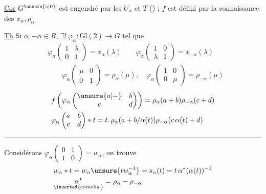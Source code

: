 \uline{Cor}  $G^{\unsure{\circ|0}}$ est engendré par les $U_\alpha$ et $T$ () ; $f$ est défini  par la connaissance des $x_\alpha,\rho_\alpha$

\uline{Th} Si $\alpha,-\alpha\in R$, $\exists !\ \varphi_\alpha:\mathrm{Gl}(2)\longrightarrow G$ tel que
\[
\begin{aligned}
&\varphi_\alpha\begin{pmatrix}1&\lambda\\0&1\end{pmatrix}=x_\alpha(\lambda)
 \qquad \varphi_\alpha\begin{pmatrix}1&0\\\lambda&1\end{pmatrix}=x_{-\alpha}(\lambda)\\
&\qquad\varphi_\alpha\begin{pmatrix}\mu&0\\0&1\end{pmatrix}=\rho_\alpha(\mu),\quad
\varphi_\alpha\begin{pmatrix}1&0\\0&\mu\end{pmatrix}=\rho_{-\alpha}(\mu)
\end{aligned}
\]
\[
\begin{aligned}
&f\left(\varphi_\alpha\begin{pmatrix}\unsure{a|-}&b\\c&d\end{pmatrix}\right)
=\rho_\alpha(a+b)\rho_{-\alpha}(c+d)\\
&\varphi_\alpha\begin{pmatrix}a&b\\c&d\end{pmatrix}*t
=t.\,\rho_\alpha(a+b/\alpha(t))\rho_{-\alpha}(c\,\alpha(t)+d)
\end{aligned}
\]
\begin{center}\rule{1.25cm}{.35pt}\end{center}

\uline{} Considérons $\varphi_\alpha\begin{pmatrix}0&1\\1&0\end{pmatrix}=w_\alpha$, on trouve
\[
\begin{aligned}
&w_\alpha*t=w_\alpha\unsure{t w_\alpha^{-1}}=s_\alpha(t)=t\,\alpha^*(\alpha(t))^{-1}\\
&\underset{\text{\inserted{coracine}}}{\alpha^*}=\rho_\alpha-\rho_{-\alpha}
\end{aligned}
\]

